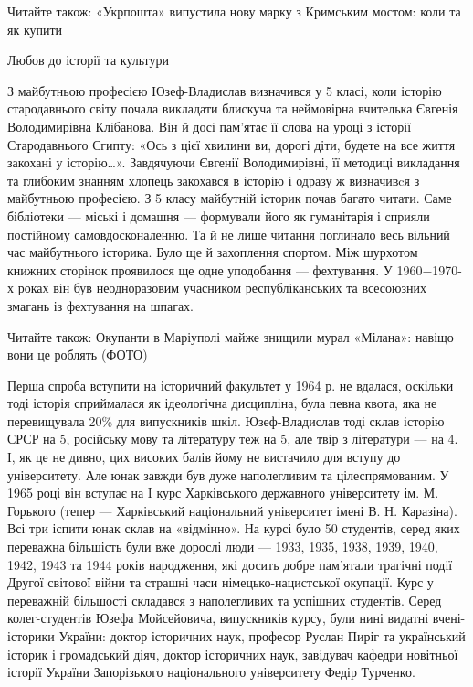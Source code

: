 Читайте також: «Укрпошта» випустила нову марку з Кримським мостом: коли та як
купити

Любов до історії та культури

З майбутньою професією Юзеф-Владислав визначився у 5 класі, коли історію
стародавнього світу почала викладати блискуча та неймовірна вчителька Євгенія
Володимирівна Клібанова. Він й досі пам’ятає її слова на уроці з історії
Стародавнього Єгипту: «Ось з цієї хвилини ви, дорогі діти, будете на все життя
закохані у історію…». Завдячуючи Євгенії Володимирівні, її методиці викладання
та глибоким знанням хлопець закохався в історію і одразу ж визначивcя з
майбутньою професією. З 5 класу майбутній історик почав багато читати. Саме
бібліотеки — міські і домашня — формували його як гуманітарія і сприяли
постійному самовдосконаленню. Та й не лише читання поглинало весь вільний час
майбутнього історика. Було ще й захоплення спортом. Між шурхотом книжних
сторінок проявилося ще одне уподобання — фехтування. У 1960−1970-х роках він
був неодноразовим учасником республіканських та всесоюзних змагань із
фехтування на шпагах.

Читайте також: Окупанти в Маріуполі майже знищили мурал «Мілана»: навіщо вони це роблять (ФОТО)

Перша спроба вступити на історичний факультет у 1964 р. не вдалася, оскільки
тоді історія сприймалася як ідеологічна дисципліна, була певна квота, яка не
перевищувала 20\% для випускників шкіл. Юзеф-Владислав тоді склав історію СРСР
на 5, російську мову та літературу теж на 5, але твір з літератури — на 4. І,
як це не дивно, цих високих балів йому не вистачило для вступу до університету.
Але юнак завжди був дуже наполегливим та цілеспрямованим. У 1965 році він
вступає на I курс Харківського державного університету ім. М. Горького (тепер —
Харківський національний університет імені В. Н. Каразіна). Всі три іспити юнак
склав на «відмінно». На курсі було 50 студентів, серед яких переважна більшість
були вже дорослі люди — 1933, 1935, 1938, 1939, 1940, 1942, 1943 та 1944 років
народження, які досить добре пам’ятали трагічні події Другої світової війни та
страшні часи німецько-нацистської окупації. Курс у переважній більшості
складався з наполегливих та успішних студентів. Серед колег-студентів Юзефа
Мойсейовича, випускників курсу, були нині видатні вчені-історики України:
доктор історичних наук, професор Руслан Пиріг та український історик і
громадський діяч, доктор історичних наук, завідувач кафедри новітньої історії
України Запорізького національного університету Федір Турченко.

